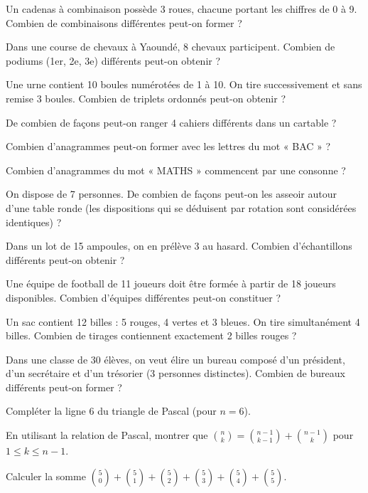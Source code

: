 \exo{}
Un cadenas à combinaison possède 3 roues, chacune portant les chiffres de 0 à 9. Combien de combinaisons différentes peut-on former ?

\exo{}
Dans une course de chevaux à Yaoundé, 8 chevaux participent. Combien de podiums (1er, 2e, 3e) différents peut-on obtenir ?

\exo{}
Une urne contient 10 boules numérotées de 1 à 10. On tire successivement et sans remise 3 boules. Combien de triplets ordonnés peut-on obtenir ?


\exo{}
De combien de façons peut-on ranger 4 cahiers différents dans un cartable ?

\exo{}
Combien d'anagrammes peut-on former avec les lettres du mot « BAC » ?

\exo{}
Combien d'anagrammes du mot « MATHS » commencent par une consonne ?

\exo{}
On dispose de 7 personnes. De combien de façons peut-on les asseoir autour d'une table ronde (les dispositions qui se déduisent par rotation sont considérées identiques) ?


\exo{}
Dans un lot de 15 ampoules, on en prélève 3 au hasard. Combien d'échantillons différents peut-on obtenir ?

\exo{}
Une équipe de football de 11 joueurs doit être formée à partir de 18 joueurs disponibles. Combien d'équipes différentes peut-on constituer ?

\exo{}
Un sac contient 12 billes : 5 rouges, 4 vertes et 3 bleues. On tire simultanément 4 billes. Combien de tirages contiennent exactement 2 billes rouges ?

\exo{}
Dans une classe de 30 élèves, on veut élire un bureau composé d'un président, d'un secrétaire et d'un trésorier (3 personnes distinctes). Combien de bureaux différents peut-on former ?


\exo{}
Compléter la ligne 6 du triangle de Pascal (pour $n=6$).

\exo{}
En utilisant la relation de Pascal, montrer que $\binom{n}{k} = \binom{n-1}{k-1} + \binom{n-1}{k}$ pour $1 \le k \le n-1$.

\exo{}
Calculer la somme $\binom{5}{0} + \binom{5}{1} + \binom{5}{2} + \binom{5}{3} + \binom{5}{4} + \binom{5}{5}$.

